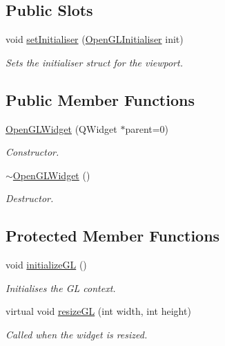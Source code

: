 \subsection*{Public Slots}
\begin{DoxyCompactItemize}
\item 
void \hyperlink{class_open_g_l_widget_a74bce7d1864404aecda09f3765f081a5}{set\-Initialiser} (\hyperlink{struct_open_g_l_initialiser}{Open\-G\-L\-Initialiser} init)
\begin{DoxyCompactList}\small\item\em Sets the initialiser struct for the viewport. \end{DoxyCompactList}\end{DoxyCompactItemize}
\subsection*{Public Member Functions}
\begin{DoxyCompactItemize}
\item 
\hyperlink{class_open_g_l_widget_a5ccf35934a92564aef1d796b01f9e288}{Open\-G\-L\-Widget} (Q\-Widget $\ast$parent=0)
\begin{DoxyCompactList}\small\item\em Constructor. \end{DoxyCompactList}\item 
\hypertarget{class_open_g_l_widget_a293847f6a7e6c40344a1acfca3e9eb51}{\hyperlink{class_open_g_l_widget_a293847f6a7e6c40344a1acfca3e9eb51}{$\sim$\-Open\-G\-L\-Widget} ()}\label{class_open_g_l_widget_a293847f6a7e6c40344a1acfca3e9eb51}

\begin{DoxyCompactList}\small\item\em Destructor. \end{DoxyCompactList}\end{DoxyCompactItemize}
\subsection*{Protected Member Functions}
\begin{DoxyCompactItemize}
\item 
\hypertarget{class_open_g_l_widget_a570df546f7206455c57addb624906576}{void \hyperlink{class_open_g_l_widget_a570df546f7206455c57addb624906576}{initialize\-G\-L} ()}\label{class_open_g_l_widget_a570df546f7206455c57addb624906576}

\begin{DoxyCompactList}\small\item\em Initialises the G\-L context. \end{DoxyCompactList}\item 
virtual void \hyperlink{class_open_g_l_widget_abfc904f976f6c5eb58fd56e8a9d876b8}{resize\-G\-L} (int width, int height)
\begin{DoxyCompactList}\small\item\em Called when the widget is resized. \end{DoxyCompactList}\end{DoxyCompactItemize}


